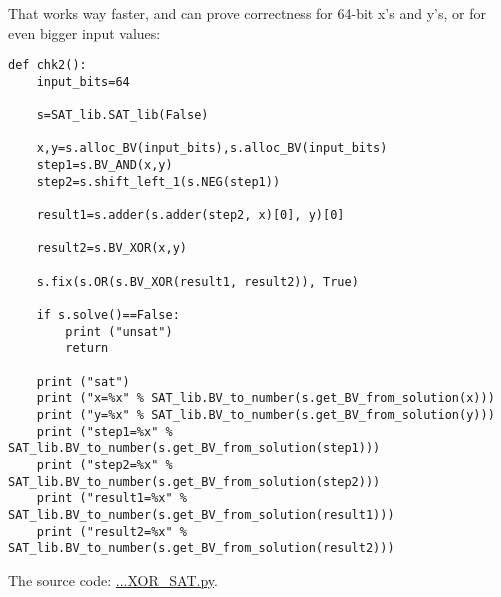 That works way faster, and can prove correctness for 64-bit x's and y's, or for even bigger input values:

\begin{lstlisting}
def chk2():
    input_bits=64

    s=SAT_lib.SAT_lib(False)

    x,y=s.alloc_BV(input_bits),s.alloc_BV(input_bits)
    step1=s.BV_AND(x,y)
    step2=s.shift_left_1(s.NEG(step1))

    result1=s.adder(s.adder(step2, x)[0], y)[0]

    result2=s.BV_XOR(x,y)

    s.fix(s.OR(s.BV_XOR(result1, result2)), True)

    if s.solve()==False:
        print ("unsat")
        return

    print ("sat")
    print ("x=%x" % SAT_lib.BV_to_number(s.get_BV_from_solution(x)))
    print ("y=%x" % SAT_lib.BV_to_number(s.get_BV_from_solution(y)))
    print ("step1=%x" % SAT_lib.BV_to_number(s.get_BV_from_solution(step1)))
    print ("step2=%x" % SAT_lib.BV_to_number(s.get_BV_from_solution(step2)))
    print ("result1=%x" % SAT_lib.BV_to_number(s.get_BV_from_solution(result1)))
    print ("result2=%x" % SAT_lib.BV_to_number(s.get_BV_from_solution(result2)))
\end{lstlisting}

The source code: \url{...XOR_SAT.py}.

